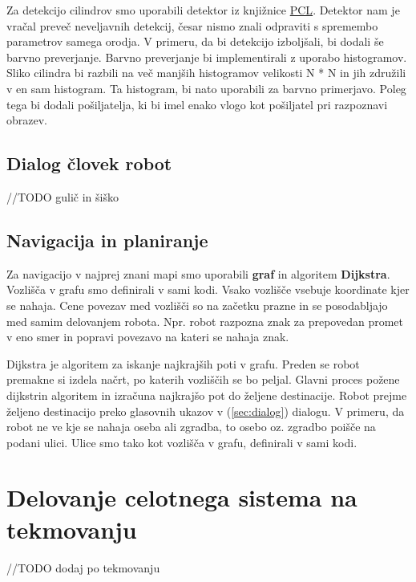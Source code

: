 \documentclass[a4paper,11pt]{article}
\begin{document}
Za detekcijo cilindrov smo uporabili detektor iz knjižnice \href{http://pointclouds.org/documentation/tutorials/cylinder_segmentation.php}{PCL}. Detektor nam je vračal preveč neveljavnih detekcij, česar nismo znali odpraviti s spremembo parametrov samega orodja. V primeru, da bi detekcijo izboljšali, bi dodali še barvno preverjanje. Barvno preverjanje bi implementirali z uporabo histogramov. Sliko cilindra bi razbili na več manjših histogramov velikosti N * N in jih združili v en sam histogram. Ta histogram, bi nato uporabili za barvno primerjavo. Poleg tega bi dodali pošiljatelja, ki bi imel enako vlogo kot pošiljatel pri razpoznavi obrazev.

\subsection{\label{sec:dialog} Dialog človek robot}

//TODO gulič in šiško

\subsection{Navigacija in planiranje}

Za navigacijo v najprej znani mapi smo uporabili \textbf{graf} in algoritem \textbf{Dijkstra}. Vozlišča v grafu smo definirali v sami kodi. Vsako vozlišče vsebuje koordinate kjer se nahaja. Cene povezav med vozlišči so na začetku prazne in se posodabljajo med samim delovanjem robota. Npr. robot razpozna znak za prepovedan promet
v eno smer in popravi povezavo na kateri se nahaja znak.

Dijkstra je algoritem za iskanje najkrajših poti v grafu. Preden se robot premakne si izdela načrt, po katerih vozliščih se bo peljal. Glavni proces požene dijkstrin algoritem in izračuna najkrajšo pot do željene destinacije. Robot prejme željeno destinacijo preko glasovnih ukazov v (\ref{sec:dialog}{}) dialogu. V primeru, da robot ne ve kje se nahaja oseba ali zgradba, to osebo oz. zgradbo poišče na podani ulici. Ulice smo tako kot vozlišča v grafu, definirali v sami kodi.

\section{Delovanje celotnega sistema na tekmovanju}

//TODO dodaj po tekmovanju

\pagebreak
\appendix
\appendixpage
\end{document}
